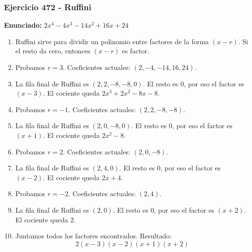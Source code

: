 \documentclass[11pt,a4paper]{article}
\begin{document}
\subsubsection*{Ejercicio 472 - Ruffini}
\textbf{Enunciado:} $ 2 x^{4} - 4 x^{3} - 14 x^{2} + 16 x + 24 $\par
\begin{enumerate}[leftmargin=2em]
\item Ruffini sirve para dividir un polinomio entre factores de la forma \((x-r)\). Si el resto da cero, entonces \((x-r)\) es factor.
\item Probamos \(r=3\). Coeficientes actuales: \((2, -4, -14, 16, 24)\).
\item La fila final de Ruffini es \((2, 2, -8, -8, 0)\). El resto es \(0\), por eso el factor es \((x-3)\). El cociente queda \(2 x^{3} + 2 x^{2} - 8 x - 8\).
\item Probamos \(r=-1\). Coeficientes actuales: \((2, 2, -8, -8)\).
\item La fila final de Ruffini es \((2, 0, -8, 0)\). El resto es \(0\), por eso el factor es \((x+1)\). El cociente queda \(2 x^{2} - 8\).
\item Probamos \(r=2\). Coeficientes actuales: \((2, 0, -8)\).
\item La fila final de Ruffini es \((2, 4, 0)\). El resto es \(0\), por eso el factor es \((x-2)\). El cociente queda \(2 x + 4\).
\item Probamos \(r=-2\). Coeficientes actuales: \((2, 4)\).
\item La fila final de Ruffini es \((2, 0)\). El resto es \(0\), por eso el factor es \((x+2)\). El cociente queda \(2\).
\item Juntamos todos los factores encontrados. Resultado: \[\boxed{2 \left(x - 3\right) \left(x - 2\right) \left(x + 1\right) \left(x + 2\right)}\]
\end{enumerate}

\vspace{0.2cm}
\end{document}
